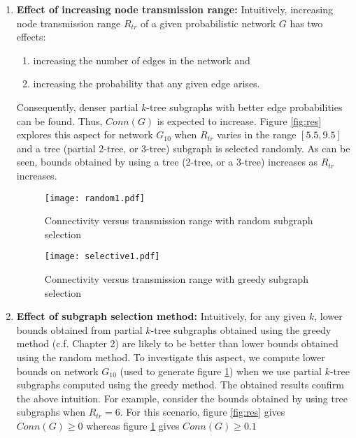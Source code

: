 \begin{enumerate}
\item \textbf{Effect of increasing node transmission range:} Intuitively, increasing node transmission range $R_{tr}$ of a given probabilistic network $G$ has two effects:
\begin{enumerate}
\item increasing the number of edges in the network and
\item increasing the probability that any given edge arises.
\end{enumerate}
 Consequently, denser partial $k$-tree subgraphs with better edge probabilities can be found. Thus, $Conn(G)$ is expected to increase. Figure \ref{fig:res} explores this aspect for network $G_{10}$ when $R_{tr}$ varies in the range $[5.5, 9.5]$ and a tree (partial 2-tree, or 3-tree) subgraph is selected randomly. As can be seen, bounds obtained by using a tree (2-tree, or a 3-tree) increases as $R_{tr}$ increases.

\begin{figure}[!htb]
\begin{minipage}[]{.5\linewidth}
\texttt{[image: random1.pdf]}
 \caption{ Connectivity versus transmission range with random subgraph selection}
\label{fig:res}
\end{minipage}
\begin{minipage}{.5\linewidth}
\texttt{[image: selective1.pdf]}
 \caption{ Connectivity versus transmission range with greedy subgraph selection}
\label{fig:ges}
 \end{minipage}
\end{figure}

\item {\bf Effect of subgraph selection method:} Intuitively, for any given $k$, lower bounds obtained from partial $k$-tree subgraphs obtained using the greedy method (c.f. Chapter 2) are likely to be better than lower bounds obtained using the random method. To investigate this aspect, we compute lower bounds on network $G_{10}$ (used to generate figure \ref{fig:ges}) when we use partial $k$-tree subgraphs computed using the greedy method. The obtained results confirm the above intuition. For example, consider the bounds obtained by using tree subgraphs when $R_{tr}=6$. For this scenario, figure \ref{fig:res} gives  $Conn(G)\geq 0$ whereas figure \ref{fig:ges} gives $Conn(G)\geq 0.1$
\end{enumerate}



